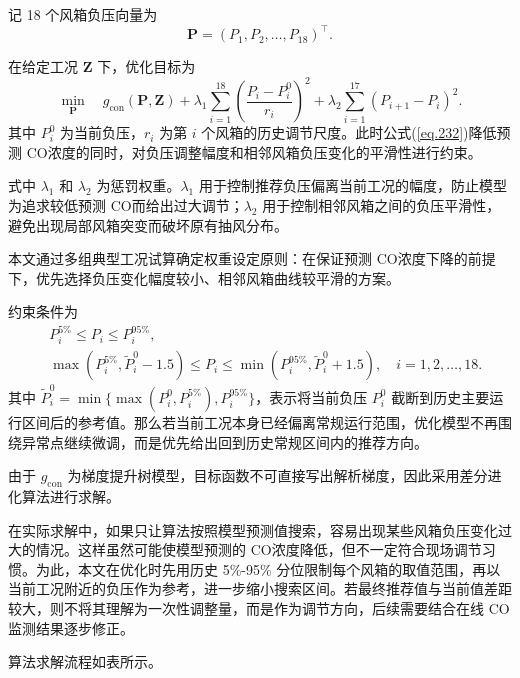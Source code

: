 \documentclass[UTF8,a4paper,zihao=-4]{ctexart}
\newcommand{\CO}{CO}
\begin{document}
记 18 个风箱负压向量为
\begin{equation}
\mathbf P=(P_1,P_2,\ldots,P_{18})^\top.
\end{equation}

在给定工况 $\mathbf Z$ 下，优化目标为
\begin{equation}
\min_{\mathbf P}\quad g_{\mathrm{con}}(\mathbf P,\mathbf Z)+\lambda_1\sum_{i=1}^{18}\left(\frac{P_i-P_i^0}{r_i}\right)^2+\lambda_2\sum_{i=1}^{17}(P_{i+1}-P_i)^2.
\label{eq.232}
\end{equation}
其中 $P_i^0$ 为当前负压，$r_i$ 为第 $i$ 个风箱的历史调节尺度。此时公式(\ref{eq.232})降低预测 \CO 浓度的同时，对负压调整幅度和相邻风箱负压变化的平滑性进行约束。

式中 $\lambda_1$ 和 $\lambda_2$ 为惩罚权重。$\lambda_1$ 用于控制推荐负压偏离当前工况的幅度，防止模型为追求较低预测 \CO 而给出过大调节；$\lambda_2$ 用于控制相邻风箱之间的负压平滑性，避免出现局部风箱突变而破坏原有抽风分布。

本文通过多组典型工况试算确定权重设定原则：在保证预测 \CO 浓度下降的前提下，优先选择负压变化幅度较小、相邻风箱曲线较平滑的方案。

约束条件为
\begin{equation}
\begin{aligned}
& P_i^{5\%}\leq P_i\leq P_i^{95\%}, \\
& \max(P_i^{5\%},\tilde P_i^0-1.5)\leq P_i\leq \min(P_i^{95\%},\tilde P_i^0+1.5), \quad i=1,2,\ldots,18.
\end{aligned}
\end{equation}
其中 $\tilde P_i^0=\min\{\max(P_i^0,P_i^{5\%}),P_i^{95\%}\}$，表示将当前负压 $P_i^0$ 截断到历史主要运行区间后的参考值。那么若当前工况本身已经偏离常规运行范围，优化模型不再围绕异常点继续微调，而是优先给出回到历史常规区间内的推荐方向。

由于 $g_{\mathrm{con}}$ 为梯度提升树模型，目标函数不可直接写出解析梯度，因此采用差分进化算法进行求解\cite{storn1997differential}。

在实际求解中，如果只让算法按照模型预测值搜索，容易出现某些风箱负压变化过大的情况。这样虽然可能使模型预测的 \CO 浓度降低，但不一定符合现场调节习惯。为此，本文在优化时先用历史 5\%-95\% 分位限制每个风箱的取值范围，再以当前工况附近的负压作为参考，进一步缩小搜索区间。若最终推荐值与当前值差距较大，则不将其理解为一次性调整量，而是作为调节方向，后续需要结合在线 \CO 监测结果逐步修正。

算法求解流程如表所示。
\end{document}
